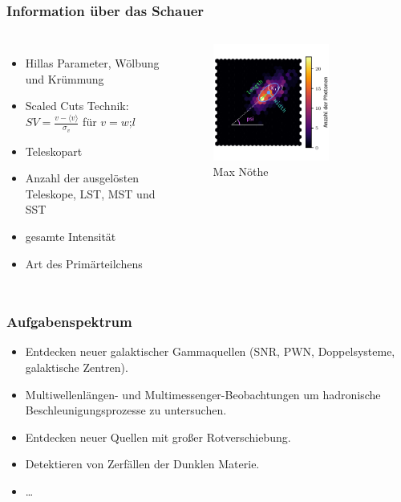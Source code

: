 \documentclass[aspectratio=1610, professionalfonts, 9pt]{beamer}
\begin{document}
  \begin{frame}
    \frametitle{Information über das Schauer}
    \begin{columns}
        \begin{itemize}
          \item Hillas Parameter, Wölbung und Krümmung
          \item Scaled Cuts Technik: $SV = \frac{v- \langle v \rangle}{\sigma_v}$ für $v=w\text{;}l$~\cite[104]{SV}
          \item Teleskopart
          \item Anzahl der ausgelösten Teleskope, LST, MST und SST
          \item gesamte Intensität
          \item Art des Primärteilchens
        \end{itemize}
        \begin{figure}
          \includegraphics[width=0.7\textwidth]{pictures/hillas_2.pdf}
          \caption{Max Nöthe}
          \label{abb:Hillas}
        \end{figure}
    \end{columns}
  \end{frame}

  \begin{frame}
    \frametitle{Aufgabenspektrum}
    \begin{itemize}
      \item Entdecken neuer galaktischer Gammaquellen (SNR, PWN, Doppelsysteme, galaktische Zentren).
      \item Multiwellenlängen- und Multimessenger-Beobachtungen um hadronische Beschleunigungsprozesse zu untersuchen.
      \item Entdecken neuer Quellen mit großer Rotverschiebung.
      \item Detektieren von Zerfällen der Dunklen Materie.
      \item \dots
    \end{itemize}
  \end{frame}
\end{document}
